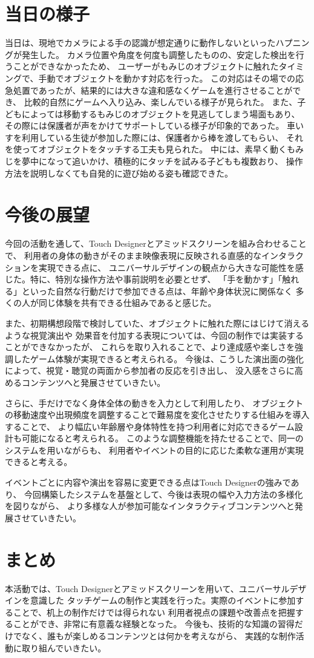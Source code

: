 \section{当日の様子}
当日は、現地でカメラによる手の認識が想定通りに動作しないといったハプニングが発生した。
カメラ位置や角度を何度も調整したものの、安定した検出を行うことができなかったため、
ユーザーがもみじのオブジェクトに触れたタイミングで、手動でオブジェクトを動かす対応を行った。
この対応はその場での応急処置であったが、結果的には大きな違和感なくゲームを進行させることができ、
比較的自然にゲームへ入り込み、楽しんでいる様子が見られた。
また、子どもによっては移動するもみじのオブジェクトを見逃してしまう場面もあり、
その際には保護者が声をかけてサポートしている様子が印象的であった。
車いすを利用している生徒が参加した際には、保護者から棒を渡してもらい、
それを使ってオブジェクトをタッチする工夫も見られた。
中には、素早く動くもみじを夢中になって追いかけ、積極的にタッチを試みる子どもも複数おり、
操作方法を説明しなくても自発的に遊び始める姿も確認できた。


\section{今後の展望}
今回の活動を通して、Touch Designerとアミッドスクリーンを組み合わせることで、
利用者の身体の動きがそのまま映像表現に反映される直感的なインタラクションを実現できる点に、
ユニバーサルデザインの観点から大きな可能性を感じた。特に、特別な操作方法や事前説明を必要とせず、
「手を動かす」「触れる」といった自然な行動だけで参加できる点は、年齢や身体状況に関係なく
多くの人が同じ体験を共有できる仕組みであると感じた。

また、初期構想段階で検討していた、オブジェクトに触れた際にはじけて消えるような視覚演出や
効果音を付加する表現については、今回の制作では実装することができなかったが、
これらを取り入れることで、より達成感や楽しさを強調したゲーム体験が実現できると考えられる。
今後は、こうした演出面の強化によって、視覚・聴覚の両面から参加者の反応を引き出し、
没入感をさらに高めるコンテンツへと発展させていきたい。

さらに、手だけでなく身体全体の動きを入力として利用したり、
オブジェクトの移動速度や出現頻度を調整することで難易度を変化させたりする仕組みを導入することで、
より幅広い年齢層や身体特性を持つ利用者に対応できるゲーム設計も可能になると考えられる。
このような調整機能を持たせることで、同一のシステムを用いながらも、
利用者やイベントの目的に応じた柔軟な運用が実現できると考える。

イベントごとに内容や演出を容易に変更できる点はTouch Designerの強みであり、
今回構築したシステムを基盤として、今後は表現の幅や入力方法の多様化を図りながら、
より多様な人が参加可能なインタラクティブコンテンツへと発展させていきたい。

\section{まとめ}
本活動では、Touch Designerとアミッドスクリーンを用いて、ユニバーサルデザインを意識した
タッチゲームの制作と実践を行った。実際のイベントに参加することで、机上の制作だけでは得られない
利用者視点の課題や改善点を把握することができ、非常に有意義な経験となった。
今後も、技術的な知識の習得だけでなく、誰もが楽しめるコンテンツとは何かを考えながら、
実践的な制作活動に取り組んでいきたい。







